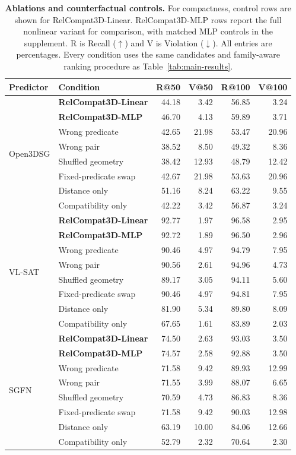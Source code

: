\begin{table}[t]
\centering
{\small
\setlength{\tabcolsep}{1.5pt}
\begin{tabular}{@{}llrrrr@{}}
\toprule
Predictor & Condition & R@50 & V@50 & R@100 & V@100 \\
\midrule
\multirow{8}{*}{Open3DSG} & \textbf{RelCompat3D-Linear} & 44.18 & 3.42 & 56.85 & 3.24 \\
& \textbf{RelCompat3D-MLP} & 46.70 & 4.13 & 59.89 & 3.71 \\
& Wrong predicate & 42.65 & 21.98 & 53.47 & 20.96 \\
& Wrong pair & 38.52 & 8.50 & 49.32 & 8.36 \\
& Shuffled geometry & 38.42 & 12.93 & 48.79 & 12.42 \\
& Fixed-predicate swap & 42.67 & 21.98 & 53.63 & 20.96 \\
& Distance only & 51.16 & 8.24 & 63.22 & 9.55 \\
& Compatibility only & 42.22 & 3.42 & 56.87 & 3.24 \\
\midrule
\multirow{8}{*}{VL-SAT} & \textbf{RelCompat3D-Linear} & 92.77 & 1.97 & 96.58 & 2.95 \\
& \textbf{RelCompat3D-MLP} & 92.72 & 1.89 & 96.50 & 2.96 \\
& Wrong predicate & 90.46 & 4.97 & 94.79 & 7.95 \\
& Wrong pair & 90.56 & 2.61 & 94.96 & 4.73 \\
& Shuffled geometry & 89.17 & 3.05 & 94.11 & 5.60 \\
& Fixed-predicate swap & 90.46 & 4.97 & 94.81 & 7.95 \\
& Distance only & 81.90 & 5.34 & 89.80 & 8.09 \\
& Compatibility only & 67.65 & 1.61 & 83.89 & 2.03 \\
\midrule
\multirow{8}{*}{SGFN} & \textbf{RelCompat3D-Linear} & 74.50 & 2.63 & 93.03 & 3.50 \\
& \textbf{RelCompat3D-MLP} & 74.57 & 2.58 & 92.88 & 3.50 \\
& Wrong predicate & 71.58 & 9.42 & 89.93 & 12.99 \\
& Wrong pair & 71.55 & 3.99 & 88.07 & 6.65 \\
& Shuffled geometry & 70.59 & 4.73 & 86.83 & 8.36 \\
& Fixed-predicate swap & 71.58 & 9.42 & 90.03 & 12.98 \\
& Distance only & 63.19 & 10.00 & 84.06 & 12.66 \\
& Compatibility only & 52.79 & 2.32 & 70.64 & 2.30 \\
\bottomrule
\end{tabular}
}
\caption{\textbf{Ablations and counterfactual controls.} For compactness, control rows are shown for RelCompat3D-Linear. RelCompat3D-MLP rows report the full nonlinear variant for comparison, with matched MLP controls in the supplement. R is Recall ($\uparrow$) and V is Violation ($\downarrow$). All entries are percentages. Every condition uses the same candidates and family-aware ranking procedure as Table~\ref{tab:main-results}.}
\label{tab:ablations}
\end{table}

